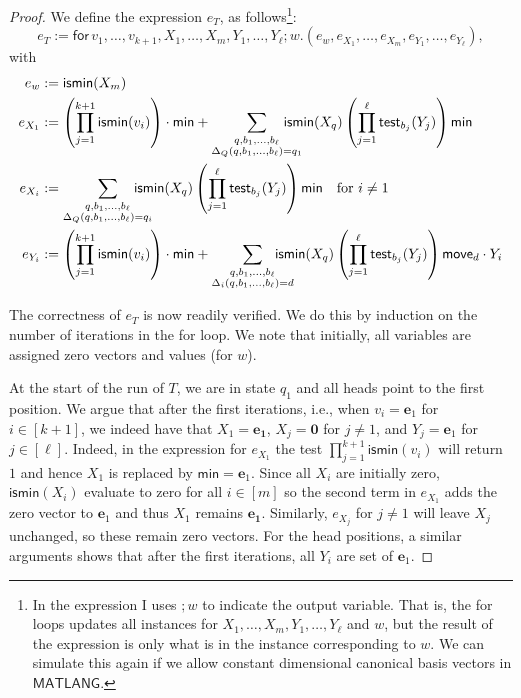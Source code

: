 \begin{proof}
We define the expression $e_T$, as follows\footnote{In the expression I uses $;w$ to indicate the output variable. That is, the for loops updates all instances for $X_1,\ldots,X_m,Y_1,\ldots,Y_\ell$ and $w$, but the result of the expression is only what is in the instance corresponding to $w$. We can simulate this again if we allow constant dimensional canonical basis vectors in $\mathsf{MATLANG}$.}:
$$
e_T:= \mathsf{for\,} v_1,\ldots,v_{k+1},X_1,\ldots,X_m,Y_1,\ldots,Y_\ell; w.(e_w,e_{X_1},\ldots,e_{X_m},e_{Y_1},\ldots,e_{Y_\ell}),
$$
with 
\begin{align*}\allowdisplaybreaks
	e_w&:=\mathsf{ismin}(X_m)\\
	e_{X_1}&:=\left(\prod_{j=1}^{k+1} \textsf{ismin}(v_i)\right)\cdot\mathsf{min}
	+ \sum_{\substack{q,b_1,\ldots,b_\ell\\
	\Delta_Q(q,b_1,\ldots,b_\ell)=q_1}} \!\!\!\!\!\!\!\!\! \textsf{ismin}(X_q)\left(\prod_{j=1}^\ell \mathsf{test}_{b_j}(Y_j)\right)\mathsf{min}\\
	e_{X_i}&:= \sum_{\substack{q,b_1,\ldots,b_\ell\\
	\Delta_Q(q,b_1,\ldots,b_\ell)=q_i}}\!\!\!\!\!\!\!\!\! \textsf{ismin}(X_q)\left(\prod_{j=1}^\ell \mathsf{test}_{b_j}(Y_j)\right)\mathsf{min} \quad \text{for $i\neq 1$}\\
	e_{Y_i}&:=\left(\prod_{j=1}^{k+1} \textsf{ismin}(v_i)\right)\cdot\mathsf{min}
	+\sum_{\substack{q,b_1,\ldots,b_\ell\\
	\Delta_i(q,b_1,\ldots,b_\ell)=d}}\!\!\!\!\!\!\!\!\! \textsf{ismin}(X_q)\left(\prod_{j=1}^\ell \mathsf{test}_{b_j}(Y_j)\right)\mathsf{move}_d\cdot Y_i
\end{align*}

The correctness of $e_T$ is now readily verified. We do this by induction on the number of iterations in the for loop. We note that initially, all variables are assigned zero vectors and values (for $w$). 

At the start of the run of $T$, we are in state $q_1$ and all heads point to the first position. We argue that after the first 
iterations, i.e., when $v_i=\mathbf{e}_1$ for $i\in[k+1]$, we indeed have that $X_1=\mathbf{e_1}$, $X_j=\mathbf{0}$ for $j\neq 1$, and $Y_j=\mathbf{e}_1$ for $j\in[\ell]$. Indeed, in the expression for $e_{X_1}$ the test $\prod_{j=1}^{k+1} \textsf{ismin}(v_i)$ will return $1$ and hence $X_1$ is replaced by $\mathsf{min}=\mathbf{e}_1$. Since all $X_i$ are initially zero, $\mathsf{ismin}(X_i)$ evaluate to zero for all $i\in[m]$ so the second term in $e_{X_1}$ adds the zero vector to $\mathbf{e}_1$ and thus $X_1$ remains $\mathbf{e_1}$.
Similarly, $e_{X_j}$ for $j\neq 1$ will leave $X_j$ unchanged, so these remain zero vectors. For the head positions, a similar arguments shows that after the first iterations, all $Y_i$ are set of $\mathbf{e}_1$.


\end{proof}
